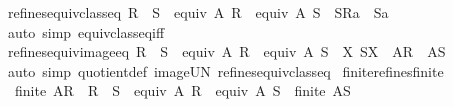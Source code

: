 \begin{isabellebody}
\endisadelimproof
\isanewline
{}\isamarkupfalse%
\ refines{\isacharunderscore}{\kern0pt}equiv{\isacharunderscore}{\kern0pt}class{\isacharunderscore}{\kern0pt}eq{}{\isacharcolon}{\kern0pt}\ {\isachardoublequoteopen}R\ {\isasymsubseteq}\ S\ {\isasymLongrightarrow}\ equiv\ A\ R\ {\isasymLongrightarrow}\ equiv\ A\ S\ {\isasymLongrightarrow}\ S{\isacharbackquote}{\kern0pt}{\isacharbackquote}{\kern0pt}{\isacharparenleft}{\kern0pt}R{\isacharbackquote}{\kern0pt}{\isacharbackquote}{\kern0pt}{\isacharbraceleft}{\kern0pt}a{\isacharbraceright}{\kern0pt}{\isacharparenright}{\kern0pt}\ {\isacharequal}{\kern0pt}\ S{\isacharbackquote}{\kern0pt}{\isacharbackquote}{\kern0pt}{\isacharbraceleft}{\kern0pt}a{\isacharbraceright}{\kern0pt}{\isachardoublequoteclose}\isanewline
%
\isadelimproof
\ \ %
\endisadelimproof
%
\isatagproof
{}\isamarkupfalse%
\ {\isacharparenleft}{\kern0pt}auto\ simp{\isacharcolon}{\kern0pt}\ equiv{\isacharunderscore}{\kern0pt}class{\isacharunderscore}{\kern0pt}eq{\isacharunderscore}{\kern0pt}iff{\isacharparenright}{\kern0pt}%
\endisatagproof
{\isafoldproof}%
%
\isadelimproof
\isanewline
%
\endisadelimproof
\isanewline
{}\isamarkupfalse%
\ refines{\isacharunderscore}{\kern0pt}equiv{\isacharunderscore}{\kern0pt}image{\isacharunderscore}{\kern0pt}eq{\isacharcolon}{\kern0pt}\ {\isachardoublequoteopen}R\ {\isasymsubseteq}\ S\ {\isasymLongrightarrow}\ equiv\ A\ R\ {\isasymLongrightarrow}\ equiv\ A\ S\ {\isasymLongrightarrow}\ {\isacharparenleft}{\kern0pt}{\isasymlambda}X{\isachardot}{\kern0pt}\ S{\isacharbackquote}{\kern0pt}{\isacharbackquote}{\kern0pt}X{\isacharparenright}{\kern0pt}\ {\isacharbackquote}{\kern0pt}\ {\isacharparenleft}{\kern0pt}A{\isacharslash}{\kern0pt}{\isacharslash}{\kern0pt}R{\isacharparenright}{\kern0pt}\ {\isacharequal}{\kern0pt}\ A{\isacharslash}{\kern0pt}{\isacharslash}{\kern0pt}S{\isachardoublequoteclose}\isanewline
%
\isadelimproof
\ \ \ %
\endisadelimproof
%
\isatagproof
{}\isamarkupfalse%
\ {\isacharparenleft}{\kern0pt}auto\ simp{\isacharcolon}{\kern0pt}\ quotient{\isacharunderscore}{\kern0pt}def\ image{\isacharunderscore}{\kern0pt}UN\ refines{\isacharunderscore}{\kern0pt}equiv{\isacharunderscore}{\kern0pt}class{\isacharunderscore}{\kern0pt}eq{}{\isacharparenright}{\kern0pt}%
\endisatagproof
{\isafoldproof}%
%
\isadelimproof
\isanewline
%
\endisadelimproof
\isanewline
{}\isamarkupfalse%
\ finite{\isacharunderscore}{\kern0pt}refines{\isacharunderscore}{\kern0pt}finite{\isacharcolon}{\kern0pt}\isanewline
\ \ {\isachardoublequoteopen}finite\ {\isacharparenleft}{\kern0pt}A{\isacharslash}{\kern0pt}{\isacharslash}{\kern0pt}R{\isacharparenright}{\kern0pt}\ {\isasymLongrightarrow}\ R\ {\isasymsubseteq}\ S\ {\isasymLongrightarrow}\ equiv\ A\ R\ {\isasymLongrightarrow}\ equiv\ A\ S\ {\isasymLongrightarrow}\ finite\ {\isacharparenleft}{\kern0pt}A{\isacharslash}{\kern0pt}{\isacharslash}{\kern0pt}S{\isacharparenright}{\kern0pt}{\isachardoublequoteclose}\isanewline

\end{isabellebody}
